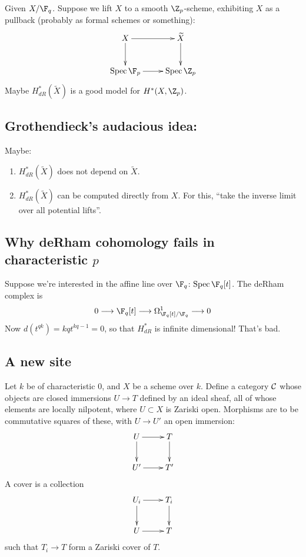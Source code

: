 \begin{SaulCrystallineCohomology}
Given $X/\F_q$. Suppose we lift $X$ to a smooth $\Z_p$-scheme, exhibiting $X$ as a pullback (probably as formal schemes or something):
\[\xymatrix{
 X\ar[r]\ar[d]& \widetilde{X}\ar[d]\\
 \ar[r]\spec\F_p& \spec\Z_p
}\]
Maybe $H^*_{dR}(\widetilde{X})$ is a good model for $H^*(X,\Z_p)$.
\subsection*{Grothendieck's audacious idea:}
Maybe:
\begin{enumerate}\squishlist
\item $H^*_{dR}(\widetilde{X})$ does not depend on $\widetilde{X}$.
\item $H^*_{dR}(\widetilde{X})$ can be computed directly from $X$. For this, ``take the inverse limit over all potential lifts''.
\end{enumerate}
\subsection*{Why deRham cohomology fails in characteristic $p$}
Suppose we're interested in the affine line over $\F_q$: $\spec\F_q[t]$. The deRham complex is
\[0\to\F_q[t]\to\Omega^1_{\F_q[t]/\F_q}\to0\]
Now $d(t^{qk})=kqt^{kq-1}=0$, so that $H^*_{dR}$ is infinite dimensional! That's bad.
\subsection*{A new site}
Let $k$ be of characteristic $0$, and $X$ be a scheme over $k$. Define a category $\mathcal{C}$ whose objects are closed immersions $U\to T$ defined by an ideal sheaf, all of whose elements are locally nilpotent, where $U\subset X$ is Zariski open. Morphisms are to be commutative squares of these, with $U\to U'$ an open immersion:
\[\xymatrix{
 U\ar[r]\ar[d]& T\ar[d]\\
 U'\ar[r]& T'\\
}\]
A cover is a collection
\[\xymatrix{
 U_i\ar[r]\ar[d]& T_i\ar[d]\\
 U\ar[r]& T
}\]
such that $T_i\to T$ form a Zariski cover of $T$.


\end{SaulCrystallineCohomology}
